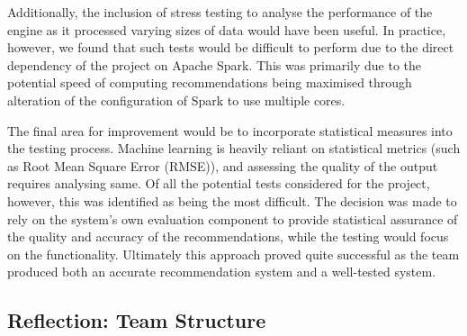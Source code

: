 \documentclass{l3proj}
\begin{document}
Additionally, the inclusion of stress testing to analyse the performance of the engine as it processed varying sizes of data would have been useful. In practice, however, we found that such tests would be difficult to perform due to the direct dependency of the project on Apache Spark. This was primarily due to the potential speed of computing recommendations being maximised through alteration of the configuration of Spark to use multiple cores.  

The final area for improvement would be to incorporate statistical measures into the testing process. Machine learning is heavily reliant on statistical metrics (such as Root Mean Square Error (RMSE)), and assessing the quality of the output requires analysing same. Of all the potential tests considered for the project, however, this was identified as being the most difficult. The decision was made to rely on the system’s own evaluation component to provide statistical assurance of the quality and accuracy of the recommendations, while the testing would focus on the functionality. Ultimately this approach proved quite successful as the team produced both an accurate recommendation system and a well-tested system.


\subsection{Reflection: Team Structure}
\label{sec:teamstructure}




\end{document}
